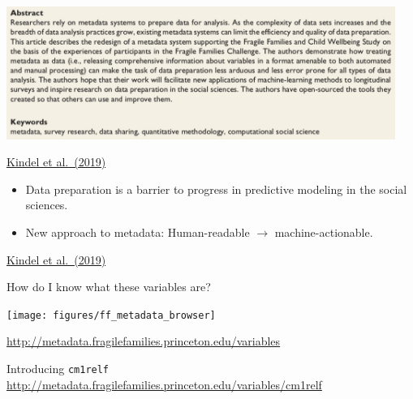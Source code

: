 \documentclass[aspectratio=169]{beamer}
\begin{document}
\begin{frame}

\begin{center}
\includegraphics[width=0.95\textwidth]{figures/kindel_improving_2019_abs}
\end{center}

\vfill
\href{https://doi.org/10.1177/2378023118817378}{Kindel et al.\ (2019)}
\end{frame}
\begin{frame}

\begin{itemize}
\item Data preparation is a barrier to progress in predictive modeling in the social sciences.
\pause
\item New approach to metadata: Human-readable $\rightarrow$ machine-actionable.
\end{itemize}

\vfill
\href{https://doi.org/10.1177/2378023118817378}{Kindel et al.\ (2019)}

\end{frame}
\begin{frame}

How do I know what these variables are? 

\begin{center}
\texttt{[image: figures/ff\_metadata\_browser]}
\end{center}

\vfill

\url{http://metadata.fragilefamilies.princeton.edu/variables}

\end{frame}
\begin{frame}

Introducing \texttt{cm1relf}\\

\url{http://metadata.fragilefamilies.princeton.edu/variables/cm1relf}

\end{frame}
\end{document}
